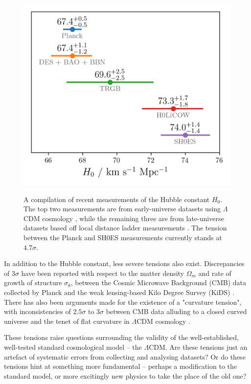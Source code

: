 \documentclass[%
 reprint,
 amsmath,amssymb,
 aps,
]{revtex4-2}
\begin{document}
\begin{figure}
    \includegraphics[width=0.8\columnwidth]{../plots/H0 tension.png}
    \centering
    \label{H0_tension}
    \caption{A compilation of recent measurements of the Hubble constant $H_0$. The top two measurements are from early-universe datasets using $\Lambda$CDM cosmology \cite{Planck2020, Abbott2018}, while the remaining three are from late-universe datasets based off local distance ladder measurements \cite{Freedman2020, Riess2019, Wong2019}. The tension between the Planck and SH0ES measurements currently stands at $4.7 \sigma$.}
\end{figure}


In addition to the Hubble constant, less severe tensions also exist. Discrepancies of $3\sigma$ have been reported with respect to the matter density $\Omega_m$ and rate of growth of structure $\sigma_8$, between the Cosmic Microwave Background (CMB) data collected by Planck and the weak lensing-based Kilo Degree Survey (KiDS) \cite{Heymans2021}. There has also been arguments made for the existence of a "curvature tension", with inconsistencies of $2.5 \sigma$ to $3 \sigma$ between CMB data alluding to a closed curved universe and the tenet of flat curvature in $\Lambda$CDM cosmology \cite{Handley2021Closed}.

These tensions raise questions surrounding the validity of the well-established, well-tested standard cosmological model -- the $\Lambda$CDM. Are these tensions just an artefact of systematic errors from collecting and analysing datasets? Or do these tensions hint at something more fundamental -- perhaps a modification to the standard model, or more excitingly new physics to take the place of the old one?
\end{document}
